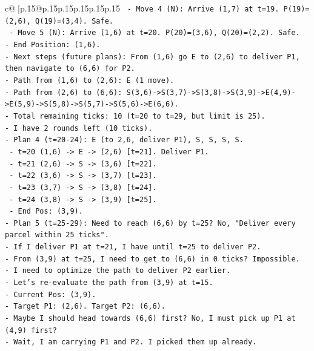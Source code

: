 \documentclass{article}
\begin{document}
{\begin{supertabular}{c@{$\;$}|p{.15\linewidth}@{}p{.15\linewidth}p{.15\linewidth}p{.15\linewidth}p{.15\linewidth}p{.15\linewidth}}
{{{\texttt{  {-} Move 4 (N): Arrive (1,7) at t=19. P(19)=(2,6), Q(19)=(3,4). Safe.} \\
\texttt{  {-} Move 5 (N): Arrive (1,6) at t=20. P(20)=(3,6), Q(20)=(2,2). Safe.} \\
\texttt{{-} End Position: (1,6).} \\
\texttt{{-} Next steps (future plans): From (1,6) go E to (2,6) to deliver P1, then navigate to (6,6) for P2.} \\
\texttt{{-} Path from (1,6) to (2,6): E (1 move).} \\
\texttt{{-} Path from (2,6) to (6,6): S(3,6){-}>S(3,7){-}>S(3,8){-}>S(3,9){-}>E(4,9){-}>E(5,9){-}>S(5,8){-}>S(5,7){-}>S(5,6){-}>E(6,6).} \\
\texttt{{-} Total remaining ticks: 10 (t=20 to t=29, but limit is 25).} \\
\texttt{{-} I have 2 rounds left (10 ticks).} \\
\texttt{{-} Plan 4 (t=20{-}24): E (to 2,6, deliver P1), S, S, S, S.} \\
\texttt{  {-} t=20 (1,6) {-}> E {-}> (2,6) {[}t=21{]}. Deliver P1.} \\
\texttt{  {-} t=21 (2,6) {-}> S {-}> (3,6) {[}t=22{]}.} \\
\texttt{  {-} t=22 (3,6) {-}> S {-}> (3,7) {[}t=23{]}.} \\
\texttt{  {-} t=23 (3,7) {-}> S {-}> (3,8) {[}t=24{]}.} \\
\texttt{  {-} t=24 (3,8) {-}> S {-}> (3,9) {[}t=25{]}.} \\
\texttt{  {-} End Pos: (3,9).} \\
\texttt{{-} Plan 5 (t=25{-}29): Need to reach (6,6) by t=25? No, "Deliver every parcel within 25 ticks".} \\
\texttt{{-} If I deliver P1 at t=21, I have until t=25 to deliver P2.} \\
\texttt{{-} From (3,9) at t=25, I need to get to (6,6) in 0 ticks? Impossible.} \\
\texttt{{-} I need to optimize the path to deliver P2 earlier.} \\
\texttt{{-} Let's re{-}evaluate the path from (3,9) at t=15.} \\
\texttt{{-} Current Pos: (3,9).} \\
\texttt{{-} Target P1: (2,6). Target P2: (6,6).} \\
\texttt{{-} Maybe I should head towards (6,6) first? No, I must pick up P1 at (4,9) first?} \\
\texttt{{-} Wait, I am carrying P1 and P2. I picked them up already.} \\
}}}
\end{supertabular}}
\end{document}
